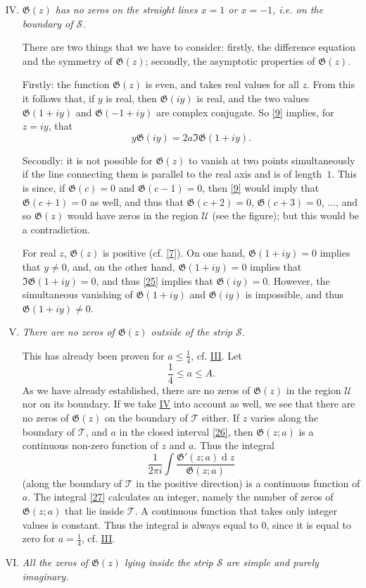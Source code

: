 \documentclass{article}
\theoremstyle{plain}
\newcommand{\dd}{\operatorname{d}\!}
\newcommand{\GG}{\mathfrak{G}}
\newcommand{\UU}{\mathscr{U}}
\newcommand{\TT}{\mathscr{T}}
\renewcommand{\SS}{\mathscr{S}}
\renewcommand{\leq}{\leqslant}
\newcommand{\oldpage}[1]{\marginpar{\footnotesize$\Big\vert$ \textit{p.~#1}}}
\begin{document}
\begin{enumerate}[I.]
\setcounter{enumi}{3}
  \item \emph{$\GG(z)$ has no zeros on the straight lines $x=1$ or $x=-1$, i.e. on the boundary of $\SS$.}
    \label{IV}

    There are two things that we have to consider:
\oldpage{312}
    firstly, the difference equation and the symmetry of $\GG(z)$; secondly, the asymptotic properties of $\GG(z)$.

    Firstly:
    the function $\GG(z)$ is even, and takes real values for all $z$.
    From this it follows that, if $y$ is real, then $\GG(iy)$ is real, and the two values $\GG(1+iy)$ and $\GG(-1+iy)$ are complex conjugate.
    So \cref{9} implies, for $z=iy$, that
    \[
    \label{25}
      y\GG(iy) = 2a\Im\GG(1+iy).
    \tag{25}
    \]

    Secondly:
    it is not possible for $\GG(z)$ to vanish at two points simultaneously if the line connecting them is parallel to the real axis and is of length~$1$.
    This is since, if $\GG(c)=0$ and $\GG(c-1)=0$, then \cref{9} would imply that $\GG(c+1)=0$ as well, and thus that $\GG(c+2)=0$, $\GG(c+3)=0$, ..., and so $\GG(z)$ would have zeros in the region $\UU$ (see the figure); but this would be a contradiction.

    For real $z$, $\GG(z)$ is positive (cf. \cref{7}).
    On one hand, $\GG(1+iy)=0$ implies that $y\neq0$, and, on the other hand, $\GG(1+iy)=0$ implies that $\Im\GG(1+iy)=0$, and thus \cref{25} implies that $\GG(iy)=0$.
    However, the simultaneous vanishing of $\GG(1+iy)$ and $\GG(iy)$ is impossible, and thus $\GG(1+iy)\neq0$.
  \item \emph{There are no zeros of $\GG(z)$ outside of the strip $\SS$.}
    \label{V}

    This has already been proven for $a\leq\frac14$, cf. \hyperref[III]{III}.
    Let
    \[
    \label{26}
      \frac14 \leq a \leq A.
    \tag{26}
    \]
    As we have already established, there are no zeros of $\GG(z)$ in the region $\UU$ nor on its boundary.
    If we take \hyperref[IV]{IV} into account as well, we see that there are no zeros of $\GG(z)$ on the boundary of $\TT$ either.
    If $z$ varies along the boundary of $\TT$, and $a$ in the closed interval \cref{26}, then $\GG(z;a)$ is a continuous non-zero function of $z$ and $a$.
    Thus the integral
    \[
    \label{27}
      \frac{1}{2\pi i} \int \frac{\GG'(z;a)\dd z}{\GG(z;a)}
    \tag{27}
    \]
    (along the boundary of $\TT$ in the positive direction) is a continuous function of $a$.
    The integral \cref{27} calculates an integer, namely the number of zeros of $\GG(z;a)$ that lie inside $\TT$.
    A continuous function that takes only integer values is constant.
    Thus the integral is always equal to $0$, since it is equal to zero for $a=\frac14$, cf. \hyperref[III]{III}.
\oldpage{313}
  \item \emph{All the zeros of $\GG(z)$ lying inside the strip $\SS$ are simple and purely imaginary.}
    \label{VI}


\end{enumerate}
\end{document}
